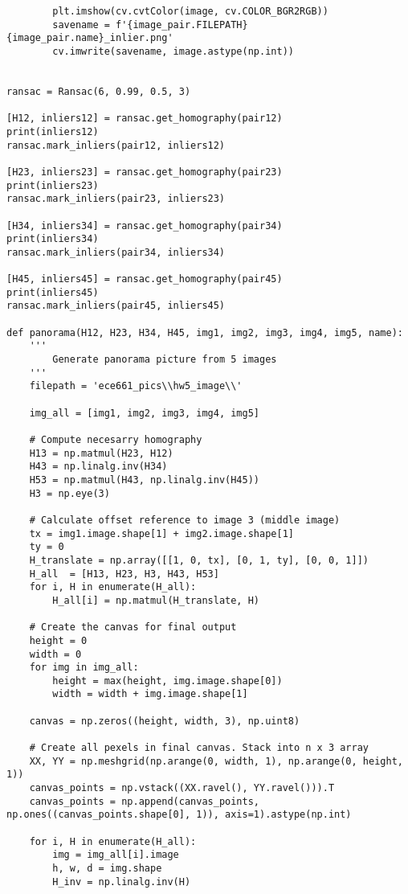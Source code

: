 \documentclass[11pt]{article}
\begin{document}
\begin{lstlisting}
        plt.imshow(cv.cvtColor(image, cv.COLOR_BGR2RGB))
        savename = f'{image_pair.FILEPATH}{image_pair.name}_inlier.png'
        cv.imwrite(savename, image.astype(np.int))


ransac = Ransac(6, 0.99, 0.5, 3)

[H12, inliers12] = ransac.get_homography(pair12)
print(inliers12)
ransac.mark_inliers(pair12, inliers12)

[H23, inliers23] = ransac.get_homography(pair23)
print(inliers23)
ransac.mark_inliers(pair23, inliers23)

[H34, inliers34] = ransac.get_homography(pair34)
print(inliers34)
ransac.mark_inliers(pair34, inliers34)

[H45, inliers45] = ransac.get_homography(pair45)
print(inliers45)
ransac.mark_inliers(pair45, inliers45)

def panorama(H12, H23, H34, H45, img1, img2, img3, img4, img5, name):
    ''' 
        Generate panorama picture from 5 images
    '''
    filepath = 'ece661_pics\\hw5_image\\'

    img_all = [img1, img2, img3, img4, img5]

    # Compute necesarry homography
    H13 = np.matmul(H23, H12)
    H43 = np.linalg.inv(H34)
    H53 = np.matmul(H43, np.linalg.inv(H45))
    H3 = np.eye(3)

    # Calculate offset reference to image 3 (middle image)
    tx = img1.image.shape[1] + img2.image.shape[1]
    ty = 0
    H_translate = np.array([[1, 0, tx], [0, 1, ty], [0, 0, 1]])
    H_all  = [H13, H23, H3, H43, H53]
    for i, H in enumerate(H_all):
        H_all[i] = np.matmul(H_translate, H)
    
    # Create the canvas for final output
    height = 0
    width = 0
    for img in img_all:
        height = max(height, img.image.shape[0])
        width = width + img.image.shape[1]

    canvas = np.zeros((height, width, 3), np.uint8)

    # Create all pexels in final canvas. Stack into n x 3 array
    XX, YY = np.meshgrid(np.arange(0, width, 1), np.arange(0, height, 1))
    canvas_points = np.vstack((XX.ravel(), YY.ravel())).T
    canvas_points = np.append(canvas_points, np.ones((canvas_points.shape[0], 1)), axis=1).astype(np.int)

    for i, H in enumerate(H_all):
        img = img_all[i].image
        h, w, d = img.shape
        H_inv = np.linalg.inv(H)


\end{lstlisting}
\end{document}
